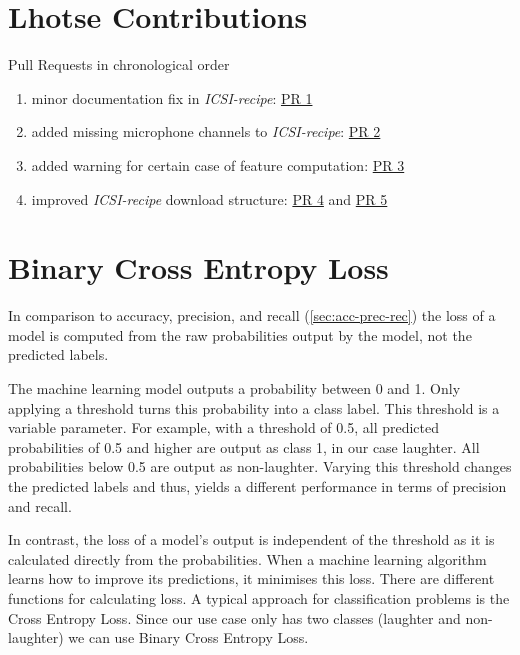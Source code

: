 \documentclass[bsc,frontabs,parskip,deptreport]{infthesis}
\begin{document}
\section{Lhotse Contributions} \label{app:lhotse-contrib}
Pull Requests in chronological order 
\begin{enumerate}
    \item minor documentation fix in \textit{ICSI-recipe}: \href{https://github.com/lhotse-speech/lhotse/pull/544}{PR 1}
    \item added missing microphone channels to \textit{ICSI-recipe}: \href{https://github.com/lhotse-speech/lhotse/pull/555}{PR 2}
    \item added warning for certain case of feature computation: \href{https://github.com/lhotse-speech/lhotse/pull/561}{PR 3}
    \item improved \textit{ICSI-recipe} download structure: \href{https://github.com/lhotse-speech/lhotse/pull/583}{PR 4} and \href{https://github.com/lhotse-speech/lhotse/pull/592}{PR 5}
\end{enumerate}

\section{Binary Cross Entropy Loss} \label{sec:cross-entropy-loss}
In comparison to accuracy, precision, and recall (\autoref{sec:acc-prec-rec}) the loss of a model is computed from the raw probabilities output by the model, not the predicted labels.

The machine learning model outputs a probability between 0 and 1. Only applying a threshold turns this probability into a class label. This threshold is a variable parameter.
For example, with a threshold of 0.5, all predicted probabilities of 0.5 and higher are output as class 1, in our case laughter. All probabilities below 0.5 are output as non-laughter. 
Varying this threshold changes the predicted labels and thus, yields a different performance in terms of precision and recall. 

In contrast, the loss of a model's output is independent of the threshold as it is calculated directly from the probabilities.
When a machine learning algorithm learns how to improve its predictions, it minimises this loss. There are different functions for calculating loss.
A typical approach for classification problems is the Cross Entropy Loss. Since our use case only has two classes (laughter and non-laughter) we can use Binary Cross Entropy Loss. 
\end{document}
